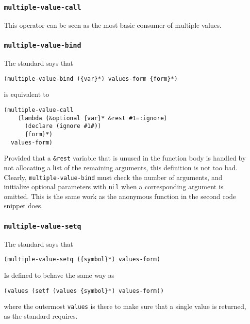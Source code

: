 \subsubsection{\texttt{multiple-value-call}}

This operator can be seen as the most basic consumer of multiple
values.

\subsubsection{\texttt{multiple-value-bind}}

The standard says that

\begin{verbatim}
(multiple-value-bind ({var}*) values-form {form}*)
\end{verbatim}

is equivalent to

\begin{verbatim}
(multiple-value-call
    (lambda (&optional {var}* &rest #1=:ignore)
      (declare (ignore #1#))
      {form}*)
  values-form)
\end{verbatim}

Provided that a \texttt{\&rest} variable that is unused in the
function body is handled by not allocating a list of the remaining
arguments, this definition is not too bad.  Clearly,
\texttt{multiple-value-bind} must check the number of arguments, and
initialize optional parameters with \texttt{nil} when a corresponding
argument is omitted.  This is the same work as the anonymous function
in the second code snippet does.

\subsubsection{\texttt{multiple-value-setq}}

The standard says that

\begin{verbatim}
(multiple-value-setq ({symbol}*) values-form)
\end{verbatim}

Is defined to behave the same way as

\begin{verbatim}
(values (setf (values {symbol}*) values-form))
\end{verbatim}

where the outermost \texttt{values} is there to make sure that a
single value is returned, as the standard requires. 

